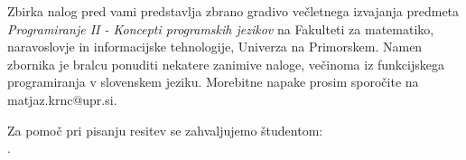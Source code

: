 \thispagestyle{empty}
\cleardoublepage
{}
\vspace*{3cm}
\begin{center}
Zbirka nalog pred vami
predstavlja zbrano gradivo  ve\v cletnega izvajanja 
predmeta \emph{Programiranje II - Koncepti programskih jezikov} na Fakulteti za matematiko, naravoslovje in informacijske tehnologije, Univerza na Primorskem. Namen zbornika je bralcu ponuditi nekatere zanimive naloge, ve\v cinoma iz funkcijskega programiranja v slovenskem jeziku. Morebitne napake prosim sporo\v cite na
matjaz.krnc@upr.si.\end{center}

\medskip

\begin{center}
    Za pomo\v c pri pisanju resitev se zahvaljujemo \v studentom: \\
		\myStudents.
\end{center}